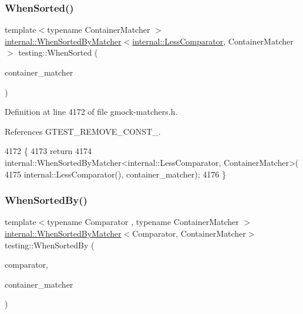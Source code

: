 \subsubsection{\texorpdfstring{When\+Sorted()}{WhenSorted()}}
{\footnotesize\ttfamily template$<$typename Container\+Matcher $>$ \\
\hyperlink{classtesting_1_1internal_1_1WhenSortedByMatcher}{internal\+::\+When\+Sorted\+By\+Matcher}$<$\hyperlink{structtesting_1_1internal_1_1LessComparator}{internal\+::\+Less\+Comparator}, Container\+Matcher$>$ testing\+::\+When\+Sorted (\begin{DoxyParamCaption}\item[{const Container\+Matcher \&}]{container\+\_\+matcher }\end{DoxyParamCaption})\hspace{0.3cm}{\ttfamily [inline]}}



Definition at line 4172 of file gmock-\/matchers.\+h.



References G\+T\+E\+S\+T\+\_\+\+R\+E\+M\+O\+V\+E\+\_\+\+C\+O\+N\+S\+T\+\_\+.


\begin{DoxyCode}
4172                                                       \{
4173   \textcolor{keywordflow}{return}
4174       internal::WhenSortedByMatcher<internal::LessComparator, ContainerMatcher>(
4175           internal::LessComparator(), container\_matcher);
4176 \}
\end{DoxyCode}
\mbox{\label{namespacetesting_af74dfcde9ed88d79cf69dfda049078a3}} 
\subsubsection{\texorpdfstring{When\+Sorted\+By()}{WhenSortedBy()}}
{\footnotesize\ttfamily template$<$typename Comparator , typename Container\+Matcher $>$ \\
\hyperlink{classtesting_1_1internal_1_1WhenSortedByMatcher}{internal\+::\+When\+Sorted\+By\+Matcher}$<$Comparator, Container\+Matcher$>$ testing\+::\+When\+Sorted\+By (\begin{DoxyParamCaption}\item[{const Comparator \&}]{comparator,  }\item[{const Container\+Matcher \&}]{container\+\_\+matcher }\end{DoxyParamCaption})\hspace{0.3cm}{\ttfamily [inline]}}



